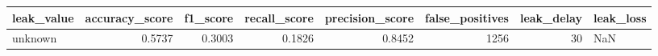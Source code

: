 \begin{tabular}{lrrrrrrl}
\toprule
leak\_value & accuracy\_score & f1\_score & recall\_score & precision\_score & false\_positives & leak\_delay & leak\_loss \\
\midrule
unknown & 0.5737 & 0.3003 & 0.1826 & 0.8452 & 1256 & 30 & NaN \\
\bottomrule
\end{tabular}
